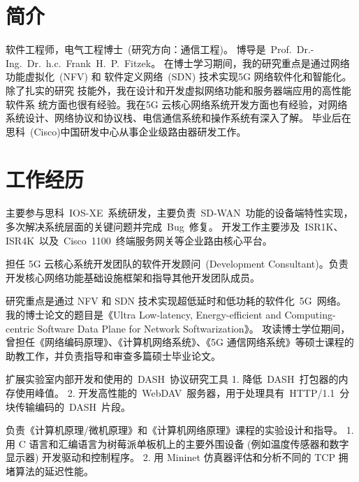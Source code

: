 \documentclass[11pt,a4paper]{moderncv}
\begin{document}
\maketitle
\vspace*{-10mm}

\section{简介}

软件工程师，电气工程博士~(研究方向：通信工程)。
博导是~Prof.~Dr.-Ing.~Dr.~h.c.~Frank~H.~P.~Fitzek。
在博士学习期间，我的研究重点是通过网络功能虚拟化~(NFV) 和
软件定义网络~(SDN) 技术实现5G 网络软件化和智能化。除了扎实的研究
技能外，我在设计和开发虚拟网络功能和服务器端应用的高性能软件系
统方面也很有经验。我在5G 云核心网络系统开发方面也有经验，对网络
系统设计、网络协议和协议栈、电信通信系统和操作系统有深入了解。
毕业后在思科~(Cisco)中国研发中心从事企业级路由器研发工作。

\section{工作经历}

{主要参与思科~IOS-XE~系统研发，主要负责~SD-WAN~功能的设备端特性实现，多次解决系统层面的关键问题并完成~Bug~修复。
	开发工作主要涉及~ISR1K、ISR4K~以及~Cisco~1100~终端服务网关等企业路由核心平台。}

{担任 5G 云核心系统开发团队的软件开发顾问~(Development Consultant)。负责开发核心网络功能基础设施框架和指导其他开发团队成员。}

{研究重点是通过 NFV 和 SDN 技术实现超低延时和低功耗的软件化~5G~网络。
我的博士论文的题目是《Ultra Low-latency, Energy-efficient and Computing-centric Software Data Plane for Network Softwarization》。
攻读博士学位期间，曾担任《网络编码原理》、《计算机网络系统》、《5G 通信网络系统》等硕士课程的助教工作，并负责指导和审查多篇硕士毕业论文。}

{扩展实验室内部开发和使用的~DASH~协议研究工具
1. 降低~DASH~打包器的内存使用峰值。
2. 开发高性能的~WebDAV~服务器，用于处理具有~HTTP/1.1~分块传输编码的~DASH~片段。}

{负责《计算机原理/微机原理》和《计算机网络原理》课程的实验设计和指导。
1. 用 C 语言和汇编语言为树莓派单板机上的主要外围设备 (例如温度传感器和数字显示器) 开发驱动和控制程序。
2. 用 Mininet 仿真器评估和分析不同的 TCP 拥堵算法的延迟性能。}
\end{document}
